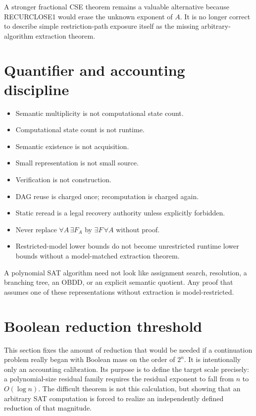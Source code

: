 \documentclass[11pt]{article}
\theoremstyle{plain}
\theoremstyle{definition}
\theoremstyle{remark}
\begin{document}
A stronger fractional CSE theorem remains a valuable alternative because
RECURCLOSE1 would erase the unknown exponent of \(A\).  It is no longer
correct to describe simple restriction-path exposure itself as the missing
arbitrary-algorithm extraction theorem.

\section{Quantifier and accounting discipline}

\begin{itemize}[leftmargin=1.4em]
\item Semantic multiplicity is not computational state count.
\item Computational state count is not runtime.
\item Semantic existence is not acquisition.
\item Small representation is not small source.
\item Verification is not construction.
\item DAG reuse is charged once; recomputation is charged again.
\item Static reread is a legal recovery authority unless explicitly forbidden.
\item Never replace $\forall A\,\exists F_A$ by $\exists F\,\forall A$ without proof.
\item Restricted-model lower bounds do not become unrestricted runtime lower
bounds without a model-matched extraction theorem.
\end{itemize}

\begin{candidatebox}
A polynomial SAT algorithm need not look like assignment search, resolution,
a branching tree, an OBDD, or an explicit semantic quotient. Any proof that
assumes one of these representations without extraction is model-restricted.
\end{candidatebox}

\section{Boolean reduction threshold}

This section fixes the amount of reduction that would be needed if a
continuation problem really began with Boolean mass on the order of $2^n$.
It is intentionally only an accounting calibration. Its purpose is to define
the target scale precisely: a polynomial-size residual family requires the
residual exponent to fall from $n$ to $O(\log n)$. The difficult theorem is
not this calculation, but showing that an arbitrary SAT computation is forced
to realize an independently defined reduction of that magnitude.
\end{document}
